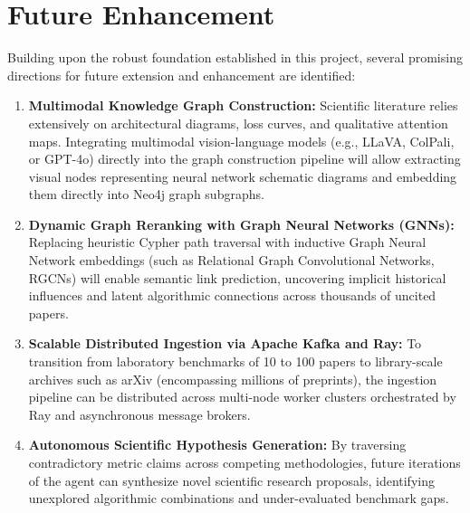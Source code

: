 \documentclass[12pt,a4paper,oneside]{report}
\begin{document}
\section{Future Enhancement}
\label{sec:future_enhancement}
Building upon the robust foundation established in this project, several promising directions for future extension and enhancement are identified:
\begin{enumerate}
    \item \textbf{Multimodal Knowledge Graph Construction:} Scientific literature relies extensively on architectural diagrams, loss curves, and qualitative attention maps. Integrating multimodal vision-language models (e.g., LLaVA, ColPali, or GPT-4o) directly into the graph construction pipeline will allow extracting visual nodes representing neural network schematic diagrams and embedding them directly into Neo4j graph subgraphs.
    \item \textbf{Dynamic Graph Reranking with Graph Neural Networks (GNNs):} Replacing heuristic Cypher path traversal with inductive Graph Neural Network embeddings (such as Relational Graph Convolutional Networks, RGCNs) will enable semantic link prediction, uncovering implicit historical influences and latent algorithmic connections across thousands of uncited papers.
    \item \textbf{Scalable Distributed Ingestion via Apache Kafka and Ray:} To transition from laboratory benchmarks of 10 to 100 papers to library-scale archives such as arXiv (encompassing millions of preprints), the ingestion pipeline can be distributed across multi-node worker clusters orchestrated by Ray and asynchronous message brokers.
    \item \textbf{Autonomous Scientific Hypothesis Generation:} By traversing contradictory metric claims across competing methodologies, future iterations of the agent can synthesize novel scientific research proposals, identifying unexplored algorithmic combinations and under-evaluated benchmark gaps.
\end{enumerate}



\nocite{*}



\end{document}
